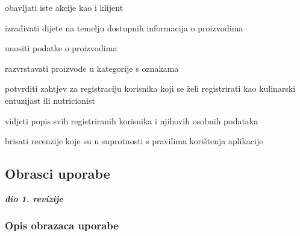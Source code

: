 \begin{packed_enum}
				\item {}
				\begin{packed_enum}
					
					\item obavljati iste akcije kao i klijent
					\item izrađivati dijete na temelju dostupnih informacija o proizvodima
					\item unositi podatke o proizvodima
					\item razvrstavati proizvode u kategorije s oznakama
				\end{packed_enum}
				
				\item {}
				\begin{packed_enum}
					\item potvrditi zahtjev za registraciju korisnika koji se želi registrirati kao kulinarski entuzijast ili nutricionist
					\item vidjeti popis svih registriranih korisnika i njihovih osobnih podataka
					\item brisati recenzije koje su u suprotnosti s pravilima korištenja aplikacije 
				\end{packed_enum}
					
				
			\end{packed_enum}
			
			\eject 
			
			
				
			\subsection{Obrasci uporabe}
				
				\textbf{\textit{dio 1. revizije}}
				
				\subsubsection{Opis obrazaca uporabe}
						
